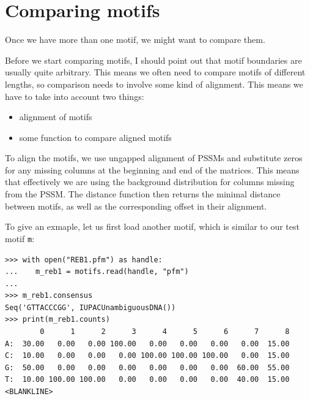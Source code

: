 \documentclass{report}
\begin{document}
\section{Comparing motifs}
\label{sec:comp}
Once we have more than one motif, we might want to compare them.

Before we start comparing motifs, I should point out that motif
boundaries are usually quite arbitrary. This means we often need
to compare motifs of different lengths, so comparison needs to involve
some kind of alignment.  This means we have to take into account two things:
\begin{itemize}
\item alignment of motifs
\item some function to compare aligned motifs
\end{itemize}
To align the motifs, we use ungapped alignment of PSSMs and substitute zeros
for any missing columns at the beginning and end of the matrices. This means
that effectively we are using the background distribution for columns missing
from the PSSM.
The distance function then returns the minimal distance between motifs, as
well as the corresponding offset in their alignment.

To give an exmaple, let us first load another motif,
which is similar to our test motif \verb|m|:
\begin{verbatim}
>>> with open("REB1.pfm") as handle:
...    m_reb1 = motifs.read(handle, "pfm")
...
>>> m_reb1.consensus
Seq('GTTACCCGG', IUPACUnambiguousDNA())
>>> print(m_reb1.counts)
        0      1      2      3      4      5      6      7      8
A:  30.00   0.00   0.00 100.00   0.00   0.00   0.00   0.00  15.00
C:  10.00   0.00   0.00   0.00 100.00 100.00 100.00   0.00  15.00
G:  50.00   0.00   0.00   0.00   0.00   0.00   0.00  60.00  55.00
T:  10.00 100.00 100.00   0.00   0.00   0.00   0.00  40.00  15.00
<BLANKLINE>
\end{verbatim}
\end{document}
